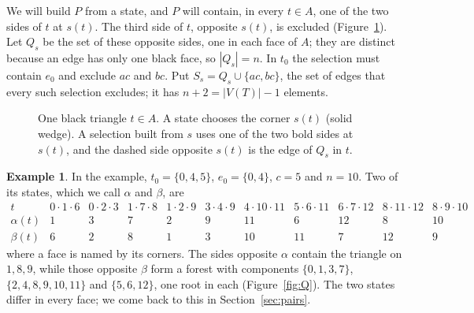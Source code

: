 \documentclass[10pt]{amsart}
\numberwithin{equation}{section}
\theoremstyle{definition}
\newtheorem{example}[equation]{Example}
\theoremstyle{remark}
\newcommand{\T}{T}
\begin{document}
We will build $P$ from a state, and $P$ will contain, in every $t\in A$, one of the two sides of $t$ at $s(t)$.
The third side of $t$, opposite $s(t)$, is excluded (Figure~\ref{fig:local}).
Let $Q_s$ be the set of these opposite sides, one in each face of $A$; they are distinct because an edge has only one black face, so $|Q_s|=n$.
In $t_0$ the selection must contain $e_0$ and exclude $ac$ and $bc$.
Put $S_s=Q_s\cup\{ac,bc\}$, the set of edges that every such selection excludes; it has $n+2=|V(\T)|-1$ elements.

\begin{figure}[!htb]
\centering
{}
\caption{One black triangle $t\in A$. A state chooses the corner $s(t)$ (solid wedge). A selection built from $s$ uses one of the two bold sides at $s(t)$, and the dashed side opposite $s(t)$ is the edge of $Q_s$ in $t$.}
\label{fig:local}
\end{figure}

\begin{example}\label{ex:states}
In the example, $t_0=\{0,4,5\}$, $e_0=\{0,4\}$, $c=5$ and $n=10$.
Two of its states, which we call $\alpha$ and $\beta$, are
\[
\begin{array}{c|cccccccccc}
t & 0{\cdot}1{\cdot}6 & 0{\cdot}2{\cdot}3 & 1{\cdot}7{\cdot}8 & 1{\cdot}2{\cdot}9 & 3{\cdot}4{\cdot}9 & 4{\cdot}10{\cdot}11 & 5{\cdot}6{\cdot}11 & 6{\cdot}7{\cdot}12 & 8{\cdot}11{\cdot}12 & 8{\cdot}9{\cdot}10\\\hline
\alpha(t) & 1 & 3 & 7 & 2 & 9 & 11 & 6 & 12 & 8 & 10\\
\beta(t) & 6 & 2 & 8 & 1 & 3 & 10 & 11 & 7 & 12 & 9
\end{array}
\]
where a face is named by its corners.
The sides opposite $\alpha$ contain the triangle on $1,8,9$, while those opposite $\beta$ form a forest with components $\{0,1,3,7\}$, $\{2,4,8,9,10,11\}$ and $\{5,6,12\}$, one root in each (Figure~\ref{fig:Q}).
The two states differ in every face; we come back to this in Section~\ref{sec:pairs}.
\end{example}
\end{document}
